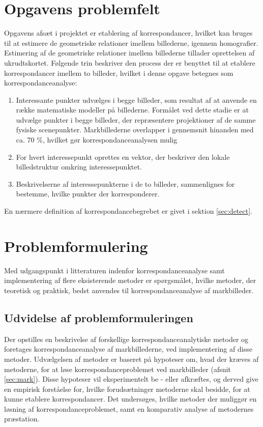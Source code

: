 \section{Opgavens problemfelt} \label{subsec:felt}
Opgavens afsæt i projektet er etablering af korrespondancer, hvilket kan bruges til at estimere de geometriske relationer imellem billederne, igennem homografier. Estimering af de geometriske relationer imellem billederne tillader oprettelsen af ukrudtskortet. Følgende trin beskriver den process der er benyttet til at etablere korrespondancer imellem to billeder, hvilket i denne opgave betegnes som korrespondanceanalyse:
\begin{enumerate}
\item{Interessante punkter udvælges i begge billeder, som resultat af at anvende en række matematiske modeller på billederne. Formålet ved dette stadie er at udvælge  punkter i begge billeder, der repræsentere projektioner af de samme fysiske scenepunkter. Markbillederne overlapper i gennemsnit hinanden med ca. 70 \%, hvilket gør korrespondanceanalysen mulig}
\item{For hvert interessepunkt oprettes en vektor, der beskriver den lokale billedstruktur omkring interessepunktet.}
\item{Beskrivelserne af interessepunkterne i de to billeder, sammenlignes for bestemme, hvilke punkter der korresponderer.}
\end{enumerate}
En nærmere definition af korrespondancebegrebet er givet i sektion \ref{sec:detect}.
\section{Problemformulering} \label{subsec:form}
Med udgangspunkt i litteraturen indenfor
korrespondanceanalyse samt implementering af
flere eksisterende metoder er spørgsmålet, hvilke metoder, der teoretisk og praktisk, bedst anvendes til korrespondanceanalyse af markbilleder.
\subsection{Udvidelse af problemformuleringen}
Der opstilles en beskrivelse af forskellige korrespondanceanalytiske metoder og foretages korrespondanceanalyse af markbillederne, ved implementering af disse metoder. Udvælgelsen af metoder er baseret på hypoteser om, hvad der kræves af metoderne, for at løse korrespondanceproblemet ved markbilleder (afsnit \ref{sec:mark}). Disse hypoteser vil eksperimentelt be - eller afkræftes, og derved give en empirisk forståelse for, hvilke forudsætninger metoderne skal besidde, for at kunne etablere korrespondancer. 
Det undersøges, hvilke metoder der muliggør en løsning af korrespondanceproblemet, samt en komparativ analyse af metodernes præstation.
